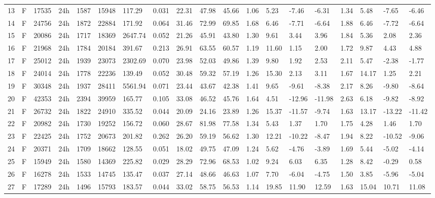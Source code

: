 \begin{tabular}{rllllllrlllllllllll}
13 & F & 17535 & 24h & 1587 & 15948 & 117.29 & 0.031 & 22.31 & 47.98 & 45.66 & 1.06 & 5.23 & -7.46 & -6.31 & 1.34 & 5.48 & -7.65 & -6.46 \\
14 & F & 24756 & 24h & 1872 & 22884 & 171.92 & 0.064 & 31.46 & 72.99 & 69.85 & 1.68 & 6.46 & -7.71 & -6.64 & 1.88 & 6.46 & -7.72 & -6.64 \\
15 & F & 20086 & 24h & 1717 & 18369 & 2647.74 & 0.052 & 21.26 & 45.91 & 43.80 & 1.30 & 9.61 & 3.44 & 3.96 & 1.84 & 5.36 & 2.08 & 2.36 \\
16 & F & 21968 & 24h & 1784 & 20184 & 391.67 & 0.213 & 26.91 & 63.55 & 60.57 & 1.19 & 11.60 & 1.15 & 2.00 & 1.72 & 9.87 & 4.43 & 4.88 \\
17 & F & 25012 & 24h & 1939 & 23073 & 2302.69 & 0.070 & 23.98 & 52.03 & 49.86 & 1.39 & 9.80 & 1.92 & 2.53 & 2.11 & 5.47 & -2.38 & -1.77 \\
18 & F & 24014 & 24h & 1778 & 22236 & 139.49 & 0.052 & 30.48 & 59.32 & 57.19 & 1.26 & 15.30 & 2.13 & 3.11 & 1.67 & 14.17 & 1.25 & 2.21 \\
19 & F & 30348 & 24h & 1937 & 28411 & 5561.94 & 0.071 & 23.44 & 43.67 & 42.38 & 1.41 & 9.65 & -9.61 & -8.38 & 2.17 & 8.26 & -9.80 & -8.64 \\
20 & F & 42353 & 24h & 2394 & 39959 & 165.77 & 0.105 & 33.08 & 46.52 & 45.76 & 1.64 & 4.51 & -12.96 & -11.98 & 2.63 & 6.18 & -9.82 & -8.92 \\
21 & F & 26732 & 24h & 1822 & 24910 & 335.52 & 0.044 & 20.09 & 24.16 & 23.89 & 1.26 & 15.37 & -11.57 & -9.74 & 1.63 & 13.17 & -13.22 & -11.42 \\
22 & F & 20982 & 24h & 1730 & 19252 & 156.72 & 0.060 & 28.67 & 81.98 & 77.58 & 1.34 & 5.43 & 1.37 & 1.70 & 1.75 & 4.28 & 1.46 & 1.70 \\
23 & F & 22425 & 24h & 1752 & 20673 & 201.82 & 0.262 & 26.20 & 59.19 & 56.62 & 1.30 & 12.21 & -10.22 & -8.47 & 1.94 & 8.22 & -10.52 & -9.06 \\
24 & F & 20371 & 24h & 1709 & 18662 & 128.55 & 0.051 & 18.02 & 49.75 & 47.09 & 1.24 & 5.62 & -4.76 & -3.89 & 1.69 & 5.44 & -5.02 & -4.14 \\
25 & F & 15949 & 24h & 1580 & 14369 & 225.82 & 0.029 & 28.29 & 72.96 & 68.53 & 1.02 & 9.24 & 6.03 & 6.35 & 1.28 & 8.42 & -0.29 & 0.58 \\
26 & F & 16278 & 24h & 1533 & 14745 & 135.47 & 0.037 & 27.14 & 48.66 & 46.63 & 1.07 & 7.70 & -6.04 & -4.75 & 1.50 & 3.85 & -5.96 & -5.04 \\
27 & F & 17289 & 24h & 1496 & 15793 & 183.57 & 0.044 & 33.02 & 58.75 & 56.53 & 1.14 & 19.85 & 11.90 & 12.59 & 1.63 & 15.04 & 10.71 & 11.08 \\

\end{tabular}
